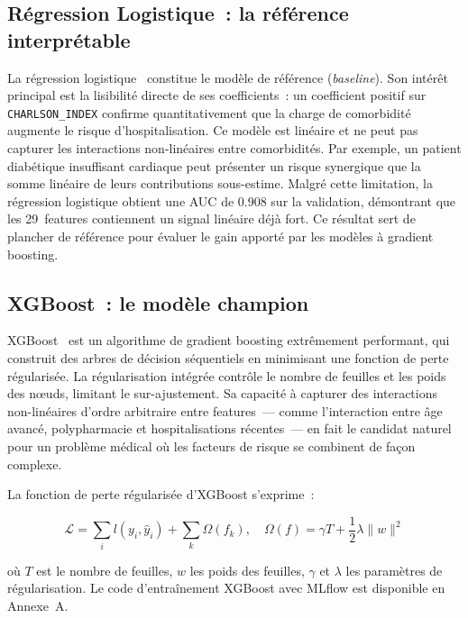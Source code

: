 \subsection{Régression Logistique~: la référence interprétable}

La régression logistique~\cite{hosmer2013applied} constitue le modèle de
référence (\textit{baseline}). Son intérêt principal est la lisibilité directe
de ses coefficients~: un coefficient positif sur \texttt{CHARLSON\_INDEX} confirme
quantitativement que la charge de comorbidité augmente le risque d'hospitalisation.
Ce modèle est linéaire et ne peut pas capturer les interactions non-linéaires entre
comorbidités. Par exemple, un patient diabétique insuffisant cardiaque peut présenter
un risque synergique que la somme linéaire de leurs contributions sous-estime.
Malgré cette limitation, la régression logistique obtient une AUC de 0.908 sur la
validation, démontrant que les 29~features contiennent un signal linéaire déjà
fort. Ce résultat sert de plancher de référence pour évaluer le gain apporté par
les modèles à gradient boosting.

\subsection{XGBoost~: le modèle champion}

XGBoost~\cite{chen2016xgboost} est un algorithme de gradient boosting extrêmement
performant, qui construit des arbres de décision séquentiels en minimisant une
fonction de perte régularisée. La régularisation intégrée contrôle le nombre de
feuilles et les poids des nœuds, limitant le sur-ajustement. Sa capacité à capturer
des interactions non-linéaires d'ordre arbitraire entre features~--- comme l'interaction
entre âge avancé, polypharmacie et hospitalisations récentes~--- en fait le candidat
naturel pour un problème médical où les facteurs de risque se combinent de façon
complexe.

La fonction de perte régularisée d'XGBoost s'exprime~:

\begin{equation}
\mathcal{L} = \sum_{i} l(y_i, \hat{y}_i) +
              \sum_k \Omega(f_k), \quad
\Omega(f) = \gamma T + \frac{1}{2}\lambda \|w\|^2
\end{equation}

\noindent où $T$ est le nombre de feuilles, $w$ les poids des feuilles, $\gamma$
et $\lambda$ les paramètres de régularisation. Le code d'entraînement XGBoost avec
MLflow est disponible en Annexe~A.

